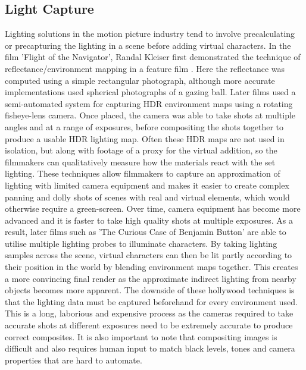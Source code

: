 \documentclass[ %
                    author={Gavin Parker},
                supervisor={Dr. Neill Campbell},
                    degree={MEng},
                     title={Deep Siamese Networks for Illumination Estimation from Stereo Images},
                  subtitle={},
                      type={research},
                      year={2018} ]{dissertation}
\begin{document}
\subsection{Light Capture}
Lighting solutions in the motion picture industry tend to involve precalculating or precapturing the lighting in a scene before adding virtual characters. In the film 'Flight of the Navigator', Randal Kleiser first demonstrated the technique of reflectance/environment mapping in a feature film \cite{navigator}. Here the reflectance was computed using a simple rectangular photograph, although more accurate implementations used spherical photographs of a gazing ball. Later films used a semi-automated system for capturing HDR environment maps using a rotating fisheye-lens camera. Once placed, the camera was able to take shots at multiple angles and at a range of exposures, before compositing the shots together to produce a usable HDR lighting map. Often these HDR maps are not used in isolation, but along with footage of a proxy for the virtual addition, so the filmmakers can qualitatively measure how the materials react with the set lighting. These techniques allow filmmakers to capture an approximation of lighting with limited camera equipment and makes it easier to create complex panning and dolly shots of scenes with real and virtual elements, which would otherwise require a green-screen. Over time, camera equipment has become more advanced and it is faster to take high quality shots at multiple exposures. As a result, later films such as 'The Curious Case of Benjamin Button' are able to utilise multiple lighting probes to illuminate characters. By taking lighting samples across the scene, virtual characters can then be lit partly according to their position in the world by blending environment maps together. This creates a more convincing final render as the approximate indirect lighting from nearby objects becomes more apparent. The downside of these hollywood techniques is that the lighting data must be captured beforehand for every environment used. This is a long, laborious and expensive process as the cameras required to take accurate shots at different exposures need to be extremely accurate to produce correct composites. It is also important to note that compositing images is difficult and also requires human input to match black levels, tones and camera properties that are hard to automate.
\end{document}
